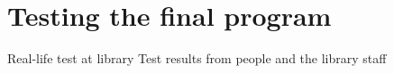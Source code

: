 \chapter{Testing the final program}
Real-life test at library
Test results from people and the library staff
